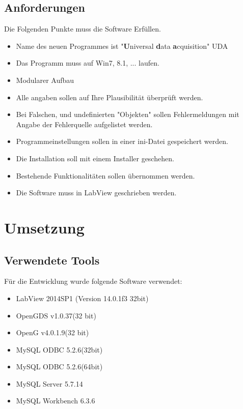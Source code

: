 \documentclass[10pt]{scrartcl}
\begin{document}
\subsection{Anforderungen}	
Die Folgenden Punkte muss die Software Erfüllen.
\begin{itemize}
	\item Name des neuen Programmes ist "\textbf{U}niversal \textbf{d}ata \textbf{a}cquisition" UDA
	\item Das Programm muss auf Win7, 8.1, ... laufen.
	\item Modularer Aufbau
	\item Alle angaben sollen auf Ihre Plausibilität überprüft werden.
	\item Bei Falschen, und undefinierten "Objekten" sollen Fehlermeldungen mit Angabe der Fehlerquelle aufgelistet werden.
	\item Programmeinstellungen sollen in einer ini-Datei gespeichert werden.
	\item Die Installation soll mit einem Installer geschehen.
	\item Bestehende Funktionalitäten sollen übernommen werden.
	\item Die Software muss in LabView geschrieben werden.
\end{itemize}
\section{Umsetzung}
\subsection{Verwendete Tools}
Für die Entwicklung wurde folgende Software verwendet:
\begin{itemize}
	\item LabView 2014SP1 (Version 14.0.1f3 32bit)
	\item OpenGDS v1.0.37(32 bit)
	\item OpenG v4.0.1.9(32 bit)
	\item MySQL ODBC 5.2.6(32bit)
	\item MySQL ODBC 5.2.6(64bit)
	\item MySQL Server 5.7.14
	\item MySQL Workbench 6.3.6
\end{itemize}
\end{document}
